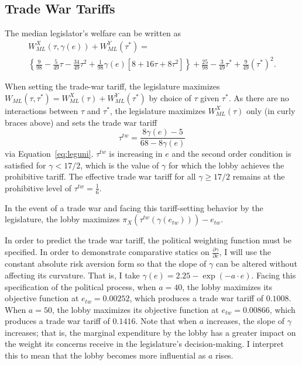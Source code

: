 \documentclass[authoryear, review]{elsarticle}
\newcommand{\ve}{\theta}
\newcommand{\ga}{\gamma}
\begin{document}
\subsection{Trade War Tariffs}
The median legislator's welfare can be written as 
\begin{multline*}
  W_{\mathit{ML}}^X(\tau,\ga(e)) + W_{\mathit{ML}}^Y(\tau^*) = \\
	\left\{\frac{9}{98} - \frac{5}{49}\tau - \frac{34}{49}\tau^2 +\frac{1}{98}\ga(e)\left[ 8 + 16\tau + 8\tau^2 \right] \right\}+ \frac{25}{98} - \frac{3}{49}\tau^* + \frac{9}{49}(\tau^*)^2.
\end{multline*}

When setting the trade-war tariff, the legislature maximizes $W_{\mathit{ML}}(\tau, \tau^*) = W_{\mathit{ML}}^X(\tau) + W_{\mathit{ML}}^Y(\tau^*)$ by choice of $\tau$ given $\tau^*$. As there are no interactions between $\tau$ and $\tau^*$, the legislature maximizes $W_{\mathit{ML}}^X(\tau)$ only (in curly braces above) and sets the trade war tariff
\[
  \tau^{tw} = \frac{8\ga(e)-5}{68-8\ga(e)}
\]
via Equation~\ref{eq:leguni}. $\tau^{tw}$ is increasing in $e$ and the second order condition is satisfied for $\ga < 17/2$, which is the value of $\ga$ for which the lobby achieves the prohibitive tariff. The effective trade war tariff for all $\ga \geq 17/2$ remains at the prohibitive level of $\tau^{tw} = \frac{1}{6}$.

In the event of a trade war and facing this tariff-setting behavior by the legislature, the lobby maximizes $\pi_X\left(\tau^{tw}\left(\ga\left(e_{tw}\right)\right)\right) - e_{tw}$.

In order to predict the trade war tariff, the political weighting function must be specified. In order to demonstrate comparative statics on $\frac{\partial \ga}{\partial e}$, I will use the constant absolute risk aversion form so that the slope of $\ga$ can be altered without affecting its curvature. That is, I take $\ga(e) = 2.25 - \exp(-a\cdot e)$. Facing this specification of the political process, when $a=40$, the lobby maximizes its objective function at $e_{tw} = 0.00252$, which produces a trade war tariff of $0.1008$. When $a=50$, the lobby maximizes its objective function at $e_{tw} = 0.00866$, which produces a trade war tariff of $0.1416$. Note that when $a$ increases, the slope of $\ga$ increases; that is, the marginal expenditure by the lobby has a greater impact on the weight its concerns receive in the legislature's decision-making. I interpret this to mean that the lobby becomes more influential as $a$ rises.
\end{document}
